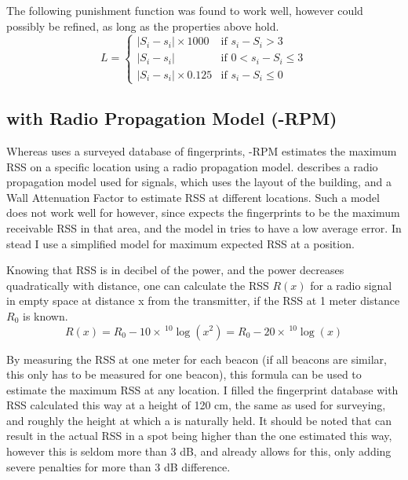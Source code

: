 The following punishment function was found to work well, however could possibly be refined, as long as the properties above hold.
\begin{equation}
    L = \begin{cases}
        |S_i - s_i| \times 1000     & \text{if } s_i - S_i > 3 \\
        |S_i - s_i|                 & \text{if } 0 < s_i -S_i \leq 3 \\
        |S_i - s_i| \times 0.125    & \text{if } s_i-S_i \leq 0 
    \end{cases}
    \label{eq:architecture-BRP-punishment}
\end{equation}

\subsection{\BRP with Radio Propagation Model (\aBRP-RPM)}
Whereas \aBRP uses a surveyed database of fingerprints, \aBRP-RPM estimates the maximum RSS on a specific location using a radio propagation model.
\citet{bahl2000radar} describes a radio propagation model used for \wifi signals, which uses the layout of the building, and a Wall Attenuation Factor to estimate RSS at different locations.
Such a model does not work well for \aBRP however, since \aBRP expects the fingerprints to be the maximum receivable RSS in that area, and the model in \citet{bahl2000radar} tries to have a low average error.
In stead I use a simplified model for maximum expected RSS at a position.

Knowing that RSS is in decibel of the power, and the power decreases quadratically with distance, one can calculate the RSS $R(x)$ for a radio signal in empty space at distance x from the transmitter, if the RSS at 1 meter distance $R_0$ is known.
\begin{equation}
    R(x) = R_0 - 10 \times \, ^{10}\log(x^2) = R_0 - 20 \times \, ^{10}\log(x)
\end{equation}

By measuring the RSS at one meter for each beacon (if all beacons are similar, this only has to be measured for one beacon), this formula can be used to estimate the maximum RSS at any location.
I filled the fingerprint database with RSS calculated this way at a height of 120 cm, the same as used for surveying, and roughly the height at which a \device is naturally held.
It should be noted that \mpp can result in the actual RSS in a spot being higher than the one estimated this way, however this is seldom more than 3 dB, and  already allows for this, only adding severe penalties for more than 3 dB difference.

